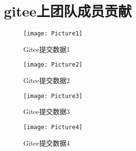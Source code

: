 \section{gitee上团队成员贡献}

\begin{figure}[htbp]
    \centering
    \begin{minipage}{0.4\textwidth}
    \centering
    \texttt{[image: Picture1]}
    \caption{Gitee提交数据1}\label{fig:dd}
    \end{minipage}
    \begin{minipage}{0.4\textwidth}
    \centering
    \texttt{[image: Picture2]}
    \caption{Gitee提交数据2}\label{fig:ds}
    \end{minipage}
    \vspace{\baselineskip}
    \end{figure}

    \begin{figure}[htbp]
        \centering
        \begin{minipage}{0.4\textwidth}
        \centering
        \texttt{[image: Picture3]}
        \caption{Gitee提交数据3}\label{fig:dd}
        \end{minipage}
        \begin{minipage}{0.4\textwidth}
        \centering
        \texttt{[image: Picture4]}
        \caption{Gitee提交数据4}\label{fig:ds}
        \end{minipage}
        \vspace{\baselineskip}
        \end{figure}
